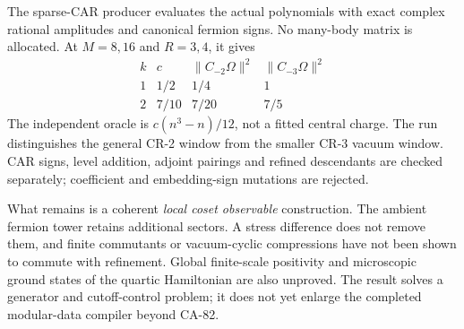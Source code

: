 The sparse-CAR producer evaluates the actual polynomials with exact complex
rational amplitudes and canonical fermion signs. No many-body matrix is
allocated. At $M=8,16$ and $R=3,4$, it gives
\[
\begin{array}{c|c|cc}
 k&c&\|C_{-2}\Omega\|^2&\|C_{-3}\Omega\|^2\\\hline
 1&1/2&1/4&1\\
 2&7/10&7/20&7/5
\end{array}
\]
The independent oracle is $c(n^3-n)/12$, not a fitted central charge.
The run distinguishes the general CR-2 window from the smaller CR-3
vacuum window. CAR signs, level addition, adjoint pairings and refined
descendants are checked separately; coefficient and embedding-sign
mutations are rejected.

What remains is a coherent \emph{local coset observable} construction.
The ambient fermion tower retains additional sectors. A stress difference
does not remove them, and finite commutants or vacuum-cyclic compressions
have not been shown to commute with refinement. Global finite-scale
positivity and microscopic ground states of the quartic Hamiltonian are
also unproved. The result solves a generator and cutoff-control problem;
it does not yet enlarge the completed modular-data compiler beyond CA-82.
